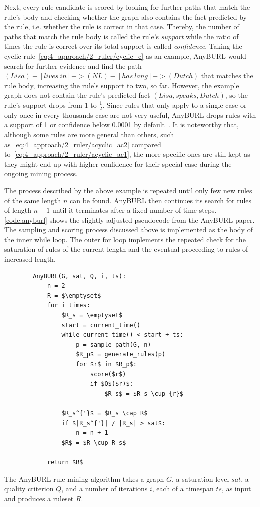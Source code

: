 Next, every rule candidate is scored by looking for further paths that match the rule's body and checking whether the graph also contains the fact predicted by the rule, i.e. whether the rule is correct in that case. Thereby, the number of paths that match the rule body is called the rule's \emph{support} while the ratio of times the rule is correct over its total support is called \emph{confidence}. Taking the cyclic rule~\ref{eq:4_approach/2_ruler/cyclic_c} as an example, AnyBURL would search for further evidence and find the path $(Lisa) - [lives~in] -> (NL) - [has~lang] -> (Dutch)$ that matches the rule body, increasing the rule's support to two, so far. However, the example graph does not contain the rule's predicted fact $(Lisa, speaks, Dutch)$, so the rule's support drops from 1 to $\frac{1}{2}$. Since rules that only apply to a single case or only once in every thousands case are not very useful, AnyBURL drops rules with a support of 1 or confidence below 0.0001 by default~\cite{AnyBURL}. It is noteworthy that, although some rules are more general than others, such as~\ref{eq:4_approach/2_ruler/acyclic_ac2} compared to~\ref{eq:4_approach/2_ruler/acyclic_ac1}, the more specific ones are still kept as they might end up with higher confidence for their special case during the ongoing mining process.

The process described by the above example is repeated until only few new rules of the same length $n$ can be found. AnyBURL then continues its search for rules of length $n + 1$ until it terminates after a fixed number of time steps. \autoref{code:anyburl} shows the slightly adjusted pseudocode from the AnyBURL paper. The sampling and scoring process discussed above is implemented as the body of the inner while loop. The outer for loop implements the repeated check for the saturation of rules of the current length and the eventual proceeding to rules of increased length.


\begin{listing}[t]
    \begin{lstlisting}
        AnyBURL(G, sat, Q, i, ts):
            n = 2
            R = $\emptyset$
            for i times:
                $R_s = \emptyset$
                start = current_time()
                while current_time() < start + ts:
                    p = sample_path(G, n)
                    $R_p$ = generate_rules(p)
                    for $r$ in $R_p$:
                        score($r$)
                        if $Q$($r)$:
                            $R_s$ = $R_s \cup {r}$

                $R_s^{'}$ = $R_s \cap R$
                if $|R_s^{'}| / |R_s| > sat$:
                    n = n + 1
                $R$ = $R \cup R_s$

            return $R$
    \end{lstlisting}
    \caption{The AnyBURL rule mining algorithm takes a graph $G$, a saturation level $sat$, a quality criterion $Q$, and a number of iterations $i$, each of a timespan $ts$, as input and produces a ruleset $R$.}
    \label{code:anyburl}
\end{listing}

